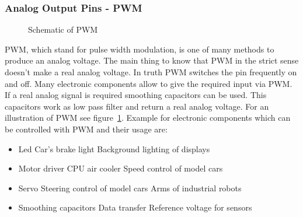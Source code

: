 \subsubsection{Analog Output Pins - PWM}\label{sec:analogOutputPinsPWM}
\begin{figure}
\caption{Schematic of PWM}
\label{fig:pwm}
\end{figure}

PWM, which stand for pulse width modulation, is one of many methods to produce an analog voltage.
The main thing to know that PWM in the strict sense doesn't make a real analog voltage.
In truth PWM switches the pin frequently on and off. 
Many electronic components allow to give the required input via PWM.
If a real analog signal is required smoothing capacitors can be used.
This capacitors work as low pass filter and return a real analog voltage.
For an illustration of PWM see figure~\ref{fig:pwm}. 
Example for electronic components which can be controlled with PWM and their usage are:
\begin{itemize}
\item Led
	\subitem Car's brake light
	\subitem Background lighting of displays
\item Motor driver
	\subitem CPU air cooler
	\subitem Speed control of model cars
\item Servo
	\subitem Steering control of model cars
	\subitem Arms of industrial robots
\item Smoothing capacitors
	\subitem Data transfer
	\subitem Reference voltage for sensors

\end{itemize}

